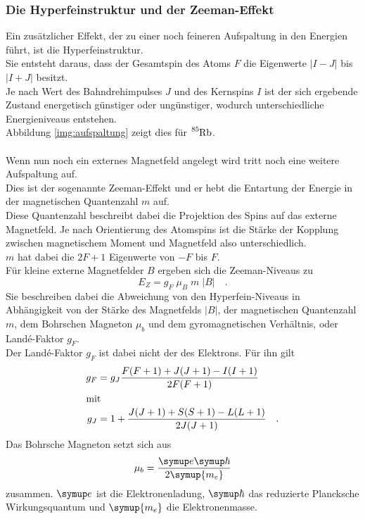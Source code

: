 \subsubsection{Die Hyperfeinstruktur und der Zeeman-Effekt}

\noindent
Ein zusätzlicher Effekt, der zu einer noch feineren Aufspaltung in den Energien führt, ist die Hyperfeinstruktur.\\
Sie entsteht daraus, dass der Gesamtspin des Atoms $F$ die Eigenwerte $\bigl| I - J \bigr|$ bis $\bigl| I + J \bigr|$ besitzt.\\
Je nach Wert des Bahndrehimpulses $J$ und des Kernspins $I$ ist der sich ergebende Zustand energetisch günstiger oder ungünstiger, wodurch unterschiedliche Energieniveaus entstehen.\\
Abbildung \ref{img:aufspaltung} zeigt dies für $\ce{^{85}Rb}$.\\\\

\noindent
Wenn nun noch ein externes Magnetfeld angelegt wird tritt noch eine weitere Aufspaltung auf.\\
Dies ist der sogenannte Zeeman-Effekt und er hebt die Entartung der Energie in der magnetischen Quantenzahl $m$ auf.\\
Diese Quantenzahl beschreibt dabei die Projektion des Spins auf das externe Magnetfeld. 
Je nach Orientierung des Atomspins ist die Stärke der Kopplung zwischen magnetischem Moment und Magnetfeld also unterschiedlich.\\
$m$ hat dabei die $2F+1$ Eigenwerte von $-F$ bis $F$.\\
Für kleine externe Magnetfelder $B$  ergeben sich die Zeeman-Niveaus zu 
\begin{equation}
    E_Z = g_F\; \mu_B \; m \;\bigl| B \bigr|\quad .
    \label{eqn:zeeman}
\end{equation}
Sie beschreiben dabei die Abweichung von den Hyperfein-Niveaus in Abhängigkeit von der Stärke des Magnetfelds $\bigl| B \bigr|$, 
der magnetischen Quantenzahl $m$, dem Bohrschen Magneton $\mu_b$ und dem gyromagnetischen Verhältnis, oder Landé-Faktor $g_F$.\\
Der Landé-Faktor $g_F$ ist dabei nicht der des Elektrons. Für ihn gilt
\begin{align*}
    g_F &= g_J\frac{F(F+1) + J(J+1) - I(I+1)}{2F(F+1)}\\
    \intertext{mit}
    g_J &= 1 + \frac{J(J+1) + S(S+1) -L(L+1)}{2J(J+1)} \quad .
\end{align*}
Das Bohrsche Magneton setzt sich aus 
\begin{equation*}
    \mu_b = \frac{\symup e \symup \hbar}{2\symup{m_e}}
\end{equation*}
zusammen. $\symup e$  ist die Elektronenladung\cite{e0}, $\symup \hbar$ das reduzierte Plancksche Wirkungsquantum\cite{Planck} und $\symup{m_e}$ die Elektronenmasse\cite{m_e}.

